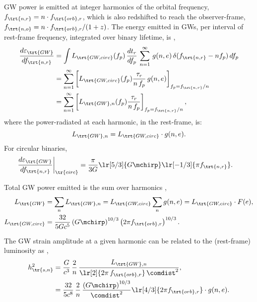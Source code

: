 \documentclass[10pt, oneside, onecolumn]{article}   	%
\newcommand{\hsn}{h_\tr{s,n}}
\newcommand{\frstorb}{f_{\trt{orb},r}}
\newcommand{\frstn}{f_\trt{n,r}}
\newcommand{\fobsn}{f_\trt{n,o}}
\newcommand{\lgw}{L_\trt{GW}}
\newcommand{\lgwn}{L_{\trt{GW},n}}
\newcommand{\lgwc}{L_\trt{GW,circ}}
\newcommand{\egw}{\varepsilon_\trt{GW}}   %
\begin{document}
            GW power is emitted at integer harmonics of the orbital frequency, $\frstn = n \cdot \frstorb$, which is also redshifted to reach the observer-frame, $\fobsn = n \cdot \frstorb / (1+z)$.  The energy emitted in GWs, per interval of rest-frame frequency, integrated over binary lifetime, is \citet[][Eq.~3.10]{enoki2007a},
            \begin{subequations}
            \begin{align}
                \frac{d \egw}{d \frstn} & = \int \lgwc(f_p) \, \frac{dt_r}{df_p} \, \sum_{n=1}^\infty \, g(n,e) \, \delta(\frstn - n f_p) \, d f_p \\
                    & = \sum_{n=1}^\infty \left[ \lgwc(f_p) \frac{\tau_r}{n \, f_p} \, g(n,e) \right]_{f_p = \frstn/n} \\
                    & = \sum_{n=1}^\infty \left[ \lgwn(f_p) \frac{\tau_r}{n \, f_p} \right]_{f_p = \frstn/n},
            \end{align}
            \end{subequations}
            where the power-radiated at each harmonic, in the rest-frame, is:
            \begin{equation}
                \lgwn = \lgwc \cdot g(n,e).
            \end{equation}
            For circular binaries,
            \begin{subequations}
            \begin{align}
                \frac{d \egw}{d \frstn} \bigg|_{\tr{circ}} & = \frac{\pi}{3 G} \lr[5/3]{G \mchirp} \lr[-1/3]{\pi \frstn}.
            \end{align}
            \end{subequations}

            Total GW power emitted is the sum over harmonics \citep[][Eq.~2.2]{enoki2007a},
            \begin{align}
                \label{eq:lum_gw}
                \lgw & = \sum_n \lgwn = \lgwc \sum_n g(n,e) = \lgwc \cdot F(e), \\
                \lgwc & = \frac{32}{5 G c^5} \left(G\mchirp\right)^{10/3} \left( 2\pi \frstorb \right)^{10/3}.
            \end{align}

            The GW strain amplitude at a given harmonic can be related to the (rest-frame) luminosity as \citep[][Eq.~2.1]{Finn+Thorne-2000},
            \begin{align}
                \label{eq:strain_lum}
                \hsn^2 & = \frac{G}{c^3} \, \frac{2}{n} \, \frac{\lgwn}{\lr[2]{2 \pi \, \frstorb} \, \comdist^2}, \\
                    & = \frac{32}{5 c^8} \, \frac{2}{n} \, \frac{\left(G\mchirp\right)^{10/3}}{\comdist^2} \lr[4/3]{2\pi\frstorb} \cdot g(n,e).
            \end{align}
\end{document}
